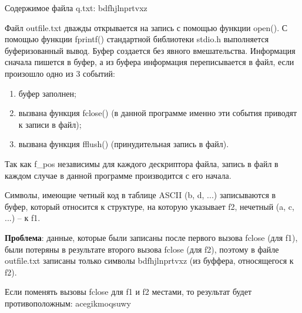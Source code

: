 Содержимое файла q.txt: bdfhjlnprtvxz

Файл outfile.txt дважды открывается на запись с помощью функции open(). 
С помощью функции fprintf() стандартной библиотеки stdio.h выполняется буферизованный вывод. Буфер создается без явного вмешательства. Информация сначала пишется в буфер, а из буфера информация переписывается в файл, если произошло одно из 3 событий:

\begin{enumerate}
	\item буфер заполнен;
	\item вызвана функция fclose() (в данной программе именно эти события приводят к записи в файл);
	\item вызвана функция fflush() (принудительная запись в файл).
\end{enumerate}

Так как f\_pos независимы для каждого дескриптора файла, запись в файл в каждом случае  в данной программе производится с его начала.

Символы, имеющие четный код в таблице ASCII  (b, d, ...) записываются в буфер, который относится к структуре, на которую указывает f2, нечетный (a, c, ...) -- к f1. 

\textbf{Проблема}: данные, которые были записаны после первого вызова fclose (для f1), были потеряны в результате второго вызова fclose (для f2), поэтому в файле outfile.txt записаны только символы bdfhjlnprtvxz (из буффера, относящегося к f2).

Если поменять вызовы fclose для f1 и f2 местами, то результат будет противоположным: acegikmoqsuwy

